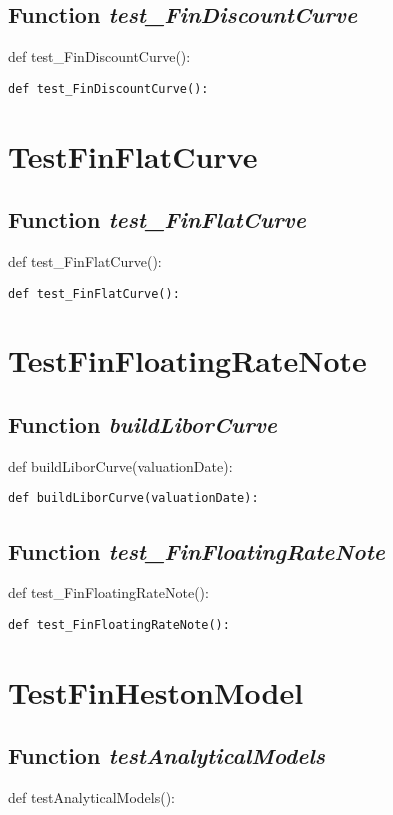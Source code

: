 \documentclass[twoside,11pt]{book}
\begin{document}
\subsection{Function {\it test\_FinDiscountCurve}}
def test\_FinDiscountCurve():

\begin{lstlisting}
def test_FinDiscountCurve():
\end{lstlisting}


\newpage
\section{TestFinFlatCurve}

\subsection{Function {\it test\_FinFlatCurve}}
def test\_FinFlatCurve():

\begin{lstlisting}
def test_FinFlatCurve():
\end{lstlisting}


\newpage
\section{TestFinFloatingRateNote}

\subsection{Function {\it buildLiborCurve}}
def buildLiborCurve(valuationDate):

\begin{lstlisting}
def buildLiborCurve(valuationDate):
\end{lstlisting}

\subsection{Function {\it test\_FinFloatingRateNote}}
def test\_FinFloatingRateNote():

\begin{lstlisting}
def test_FinFloatingRateNote():
\end{lstlisting}


\newpage
\section{TestFinHestonModel}

\subsection{Function {\it testAnalyticalModels}}
def testAnalyticalModels():
\end{document}
